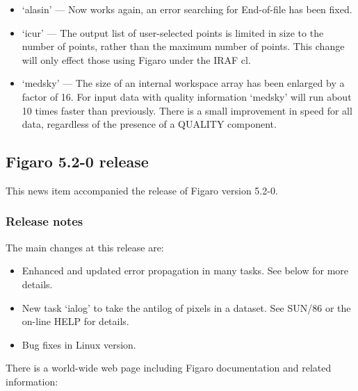 \begin{itemize}

\item `alasin' --- Now works again, an error searching for End-of-file
               has been fixed.

\item `icur'   --- The output list of user-selected points is limited in
               size to the number of points, rather than the maximum
               number of points.  This change will only effect those
               using Figaro under the IRAF cl.

\item `medsky' --- The size of an internal workspace array has been
               enlarged by a factor of 16.  For input data with
               quality information `medsky' will run about 10 times
               faster than previously.  There is a small improvement
               in speed for all data, regardless of the presence
               of a QUALITY component.

\end{itemize}


\subsection{\label{news520}Figaro 5.2-0 release}

 This news item accompanied the release of Figaro version 5.2-0.

\subsubsection{\label{news520_release_notes}Release notes}

 The main changes at this release are:

\begin{itemize}
\item Enhanced and updated error propagation in many tasks.  See
    below for more details.
\item New task `ialog' to take the antilog of pixels in a dataset.
    See SUN/86 or the on-line HELP for details.
\item Bug fixes in Linux version.
\end{itemize}

 There is a world-wide web page including Figaro documentation
 and related information:

